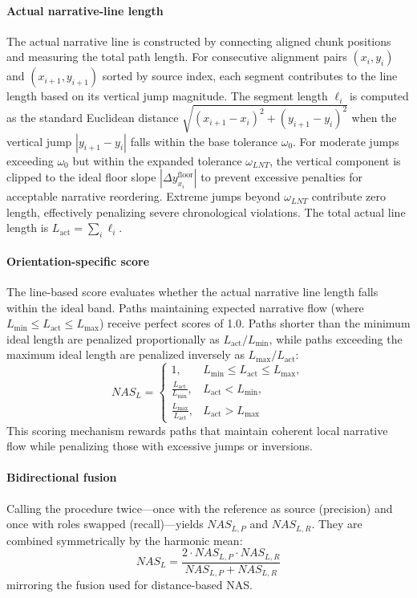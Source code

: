 \documentclass[main.tex]{subfiles}
\begin{document}
\paragraph{Actual narrative-line length}
The actual narrative line is constructed by connecting aligned chunk positions and measuring the total path length. For consecutive alignment pairs $(x_i, y_i)$ and $(x_{i+1}, y_{i+1})$ sorted by source index, each segment contributes to the line length based on its vertical jump magnitude. The segment length $\ell_i$ is computed as the standard Euclidean distance $\sqrt{(x_{i+1} - x_i)^2 + (y_{i+1} - y_i)^2}$ when the vertical jump $|y_{i+1} - y_i|$ falls within the base tolerance $\omega_0$. For moderate jumps exceeding $\omega_0$ but within the expanded tolerance $\omega_{LNT}$, the vertical component is clipped to the ideal floor slope $|\Delta y_{x_i}^{\text{floor}}|$ to prevent excessive penalties for acceptable narrative reordering. Extreme jumps beyond $\omega_{LNT}$ contribute zero length, effectively penalizing severe chronological violations. The total actual line length is $L_{\text{act}} = \sum_i \ell_i$.

\paragraph{Orientation-specific score}
The line-based score evaluates whether the actual narrative line length falls within the ideal band. Paths maintaining expected narrative flow (where $L_{\min} \leq L_{\text{act}} \leq L_{\max}$) receive perfect scores of 1.0. Paths shorter than the minimum ideal length are penalized proportionally as $L_{\text{act}}/L_{\min}$, while paths exceeding the maximum ideal length are penalized inversely as $L_{\max}/L_{\text{act}}$:
\begin{equation}
NAS_L = \begin{cases}
1, & L_{\min} \leq L_{\text{act}} \leq L_{\max}, \\
\frac{L_{\text{act}}}{L_{\min}}, & L_{\text{act}} < L_{\min}, \\
\frac{L_{\max}}{L_{\text{act}}}, & L_{\text{act}} > L_{\max}
\end{cases}
\end{equation}
This scoring mechanism rewards paths that maintain coherent local narrative flow while penalizing those with excessive jumps or inversions.

\paragraph{Bidirectional fusion}
Calling the procedure twice—once with the reference as source (precision) and once with roles swapped (recall)—yields $NAS_{L,P}$ and $NAS_{L,R}$. They are combined symmetrically by the harmonic mean:
\begin{equation}
NAS_L = \frac{2 \cdot NAS_{L,P} \cdot NAS_{L,R}}{NAS_{L,P} + NAS_{L,R}}
\end{equation}
mirroring the fusion used for distance-based NAS.
\end{document}
